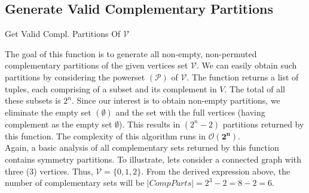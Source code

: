 \documentclass[longpaper, english, final, times]{revdetua}
\begin{document}
		\subsection{Generate Valid Complementary Partitions}
			\begin{algorithm}[h]
				\caption{Get Valid Compl. Partitions Of $\mathcal{V}$}
				\label{algorithm:GetCompPartitions}
				\DontPrintSemicolon
				
				
				
			\end{algorithm}
			The goal of this function is to generate all non-empty, non-permuted complementary partitions of the given vertices set $\mathcal{V}$. We can easily obtain such partitions by considering the powerset $(\mathcal{P})$ of $\mathcal{V}$. The function returns a list of tuples, each comprising of a subset and its complement in $V$. The total of all these subsets is $2^n$. Since our interest is to obtain non-empty partitions, we eliminate the empty set $(\emptyset)$ and the set with the full vertices (having complement as the empty set $\emptyset$). This results in $(2^{n}-2)$ partitions returned by this function. The complexity of this algorithm runs in $\mathbf{\mathcal{O}(2^n)}$.\\
			
			Again, a basic analysis of all complementary sets returned by this function contains symmetry partitions. To illustrate, lets consider a connected graph with three (3) vertices. Thus, $\mathcal{V}=\{0,1,2\}$. From the derived expression above, the number of complementary sets will be $|CompParts|=2^3-2=8-2=6$.\\
			
\end{document}
